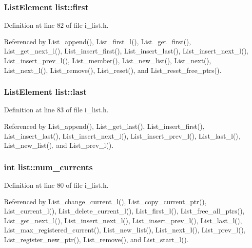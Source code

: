 \subsubsection{\setlength{\rightskip}{0pt plus 5cm}\bf{List\-Element} \bf{list::first}}\label{structlist_6f7a034f614b1b2c1f59335a0b5ca5a5}




Definition at line 82 of file i\_\-list.h.

Referenced by List\_\-append(), List\_\-first\_\-l(), List\_\-get\_\-first(), List\_\-get\_\-next\_\-l(), List\_\-insert\_\-first(), List\_\-insert\_\-last(), List\_\-insert\_\-next\_\-l(), List\_\-insert\_\-prev\_\-l(), List\_\-member(), List\_\-new\_\-list(), List\_\-next(), List\_\-next\_\-l(), List\_\-remove(), List\_\-reset(), and List\_\-reset\_\-free\_\-ptrs().
\subsubsection{\setlength{\rightskip}{0pt plus 5cm}\bf{List\-Element} \bf{list::last}}\label{structlist_4d969d7306d2d18971a1fe051297d764}




Definition at line 83 of file i\_\-list.h.

Referenced by List\_\-append(), List\_\-get\_\-last(), List\_\-insert\_\-first(), List\_\-insert\_\-last(), List\_\-insert\_\-next\_\-l(), List\_\-insert\_\-prev\_\-l(), List\_\-last\_\-l(), List\_\-new\_\-list(), and List\_\-prev\_\-l().
\subsubsection{\setlength{\rightskip}{0pt plus 5cm}int \bf{list::num\_\-currents}}\label{structlist_8bbc25298ea4c5a8078fa5ff21874d93}




Definition at line 80 of file i\_\-list.h.

Referenced by List\_\-change\_\-current\_\-l(), List\_\-copy\_\-current\_\-ptr(), List\_\-current\_\-l(), List\_\-delete\_\-current\_\-l(), List\_\-first\_\-l(), List\_\-free\_\-all\_\-ptrs(), List\_\-get\_\-next\_\-l(), List\_\-insert\_\-next\_\-l(), List\_\-insert\_\-prev\_\-l(), List\_\-last\_\-l(), List\_\-max\_\-registered\_\-current(), List\_\-new\_\-list(), List\_\-next\_\-l(), List\_\-prev\_\-l(), List\_\-register\_\-new\_\-ptr(), List\_\-remove(), and List\_\-start\_\-l().

